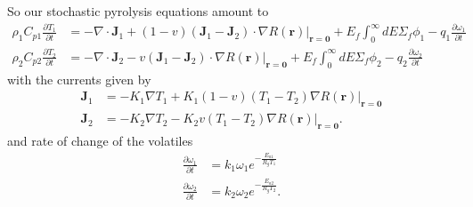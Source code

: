 \documentclass[12pt]{article}
\begin{document}
So our stochastic pyrolysis equations amount to 
\begin{align}
    \rho_1 C_{p1} \frac{\partial T_1}{\partial t}&= -\nabla \cdot \mathbf{J}_1 +(1-v)(\mathbf{J}_1-\mathbf{J}_2)\cdot \nabla R(\mathbf{r}) |_{\mathbf{r}=\mathbf{0}} + E_f \int_0 ^ \infty dE \Sigma_f \phi_1 - q_1 \frac{\partial \omega_1}{\partial t} \\
    \rho_2 C_{p2} \frac{\partial T_2}{\partial t}&= -\nabla \cdot \mathbf{J}_2 -v(\mathbf{J}_1-\mathbf{J}_2)\cdot \nabla R(\mathbf{r}) |_{\mathbf{r}=\mathbf{0}} + E_f \int_0 ^ \infty dE \Sigma_f \phi_2 - q_2 \frac{\partial \omega_2}{\partial t}
\end{align}
with the currents given by 
\begin{align}
    \mathbf{J}_1 &= -K_1 \nabla T_1 +K_1 (1-v)(T_1 -T_2) \nabla R(\mathbf{r})|_{\mathbf{r}=\mathbf{0}} \\
    \mathbf{J}_2 &= -K_2 \nabla T_2 -K_2 v(T_1 -T_2) \nabla R(\mathbf{r})|_{\mathbf{r}=\mathbf{0}}.
\end{align}
and rate of change of the volatiles 
\begin{align}
    \frac{\partial \omega _1}{\partial t} &= k_1 \omega_1 e^{-\frac{E_{a1}}{R_g T_1}} \\
    \frac{\partial \omega_2}{\partial t} &= k_2 \omega_2 e^{-\frac{E_{a2}}{R_g T_2}}.
\end{align}
\end{document}
